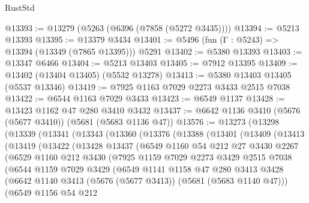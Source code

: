 \begin{lexlean}{RustStd}
\begin{coremodule}
@13393 := @13279 (@5263 (@6396 (@7858 (@5272 @3435))))
@13394 := @5213 @13393
@13395 := @13379 @3434
@13401 := @5496 (fun (Γ : @5243) => @13394 (@13349 (@7865 @13395))) @5291
@13402 := @5380 @13393
@13403 := @13347 @6466
@13404 := @5213 @13403
@13405 := @7912 @13395
@13409 := @13402 (@13404 @13405) (@5532 @13278)
@13413 := @5380 @13403 @13405 (@5537 @13346)
@13419 := @7925 @1163 @7029 @2273 @3433 @2515 @7038
@13422 := @6544 @1163 @7029 @3433
@13423 := @6549 @1137
@13428 := @13423 @1162 @47 @280 @3410 @3432
@13437 := @6642 @1136 @3410 (@5676 (@5677 @3410)) (@5681 (@5683 @1136 @47))
@13576 := @13273
    (@13298
      (@13339
        (@13341
          (@13343
            (@13360
              (@13376
                (@13388
                  (@13401
                    (@13409
                      (@13413
                        (@13419
                          (@13422
                            (@13428
                              @13437
                              (@6549
                                @1160
                                @54
                                @212
                                @27
                                @3430
                                @2267
                                (@6529
                                  @1160
                                  @212
                                  @3430
                                  (@7925
                                    @1159
                                    @7029
                                    @2273
                                    @3429
                                    @2515
                                    @7038
                                    (@6544
                                      @1159
                                      @7029
                                      @3429
                                      (@6549
                                        @1141
                                        @1158
                                        @47
                                        @280
                                        @3413
                                        @3428
                                        (@6642
                                          @1140
                                          @3413
                                          (@5676 (@5677 @3413))
                                          (@5681 (@5683 @1140 @47)))
                                        (@6549
                                          @1156
                                          @54
                                          @212

\end{coremodule}
\end{lexlean}
